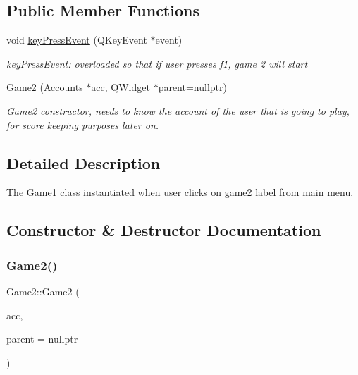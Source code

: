 \subsection*{Public Member Functions}
\begin{DoxyCompactItemize}
\item 
void \hyperlink{classGame2_ac6326093ed2adead3b2b4b7e348e81a4}{key\+Press\+Event} (Q\+Key\+Event $\ast$event)
\begin{DoxyCompactList}\small\item\em key\+Press\+Event\+: overloaded so that if user presses f1, game 2 will start \end{DoxyCompactList}\item 
\hyperlink{classGame2_aed6d39c94901e001745239ee6566e6d5}{Game2} (\hyperlink{classAccounts}{Accounts} $\ast$acc, Q\+Widget $\ast$parent=nullptr)
\begin{DoxyCompactList}\small\item\em \hyperlink{classGame2}{Game2} constructor, needs to know the account of the user that is going to play, for score keeping purposes later on. \end{DoxyCompactList}\end{DoxyCompactItemize}


\subsection{Detailed Description}
The \hyperlink{classGame1}{Game1} class instantiated when user clicks on game2 label from main menu. 

\subsection{Constructor \& Destructor Documentation}
\mbox{\label{classGame2_aed6d39c94901e001745239ee6566e6d5}} 
\subsubsection{\texorpdfstring{Game2()}{Game2()}}
{\footnotesize\ttfamily Game2\+::\+Game2 (\begin{DoxyParamCaption}\item[{\hyperlink{classAccounts}{Accounts} $\ast$}]{acc,  }\item[{Q\+Widget $\ast$}]{parent = {\ttfamily nullptr} }\end{DoxyParamCaption})\hspace{0.3cm}{\ttfamily [explicit]}}




